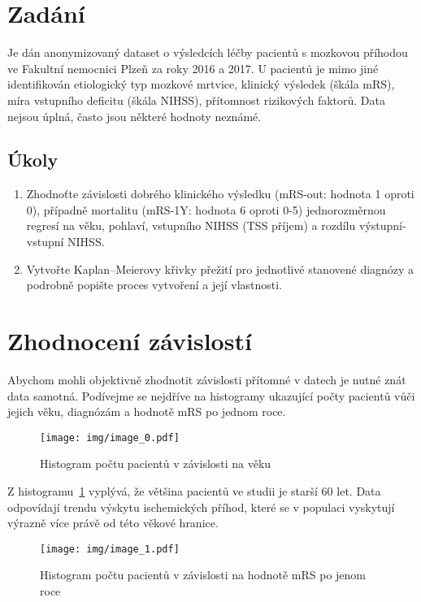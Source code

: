 \section{Zadání}

Je dán anonymizovaný dataset o výsledcích léčby pacientů s mozkovou příhodou ve Fakultní nemocnici Plzeň za roky 2016 a 2017.
U pacientů je mimo jiné identifikován etiologický typ mozkové mrtvice, klinický výsledek (škála mRS), míra vstupního deficitu (škála NIHSS), přítomnost rizikových faktorů.
Data nejsou úplná, často jsou některé hodnoty neznámé.

\subsection{Úkoly}

\begin{enumerate}
    \item Zhodnoťte závislosti dobrého klinického výsledku (mRS-out: hodnota 1 oproti 0), případně mortalitu (mRS-1Y: hodnota 6 oproti 0-5) jednorozměrnou regresí na věku, pohlaví, vstupního NIHSS (TSS příjem) a rozdílu výstupní-vstupní NIHSS.
    \item Vytvořte Kaplan–Meierovy křivky přežití pro jednotlivé stanovené diagnózy a podrobně popište proces vytvoření a její vlastnosti.
\end{enumerate}

\section{Zhodnocení závislostí}

Abychom mohli objektivně zhodnotit závislosti přítomné v datech je nutné znát data samotná.
Podívejme se nejdříve na histogramy ukazující počty pacientů vůči jejich věku, diagnózám a hodnotě mRS po jednom roce.

\begin{figure}[htbp]
    \texttt{[image: img/image\_0.pdf]}
    \centering
    \caption{Histogram počtu pacientů v závislosti na věku}
    \label{img:age-histogram}
\end{figure}
\FloatBarrier

Z histogramu~\ref{img:age-histogram} vyplývá, že většina pacientů ve studii je starší 60 let.
Data odpovídají trendu výskytu ischemických příhod, které se v populaci vyskytují výrazně více právě od této věkové hranice.

\begin{figure}[htbp]
    \texttt{[image: img/image\_1.pdf]}
    \centering
    \caption{Histogram počtu pacientů v závislosti na hodnotě mRS po jenom roce}
    \label{img:mrs-histogram}
\end{figure}
\FloatBarrier

